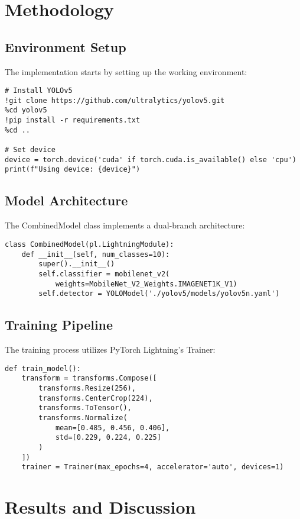 \documentclass{article}
\begin{document}
\section{Methodology}
\subsection{Environment Setup}
The implementation starts by setting up the working environment:

\begin{lstlisting}[caption=Environment Setup Code]
# Install YOLOv5
!git clone https://github.com/ultralytics/yolov5.git
%cd yolov5
!pip install -r requirements.txt
%cd ..

# Set device
device = torch.device('cuda' if torch.cuda.is_available() else 'cpu')
print(f"Using device: {device}")
\end{lstlisting}

\subsection{Model Architecture}
The CombinedModel class implements a dual-branch architecture:

\begin{lstlisting}[caption=Combined Model Implementation]
class CombinedModel(pl.LightningModule):
    def __init__(self, num_classes=10):
        super().__init__()
        self.classifier = mobilenet_v2(
            weights=MobileNet_V2_Weights.IMAGENET1K_V1)
        self.detector = YOLOModel('./yolov5/models/yolov5n.yaml')
\end{lstlisting}

\subsection{Training Pipeline}
The training process utilizes PyTorch Lightning's Trainer:

\begin{lstlisting}[caption=Training Pipeline Implementation]
def train_model():
    transform = transforms.Compose([
        transforms.Resize(256),
        transforms.CenterCrop(224),
        transforms.ToTensor(),
        transforms.Normalize(
            mean=[0.485, 0.456, 0.406],
            std=[0.229, 0.224, 0.225]
        )
    ])
    trainer = Trainer(max_epochs=4, accelerator='auto', devices=1)
\end{lstlisting}

\section{Results and Discussion}
\end{document}
